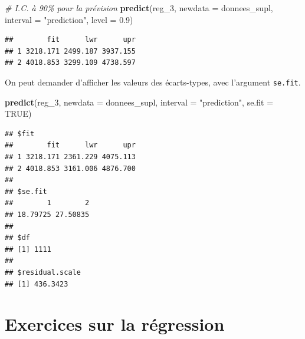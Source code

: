 \documentclass[
  11pt,
]{book}
\newenvironment{Shaded}{\begin{snugshade}}{\end{snugshade}}
\newcommand{\CommentTok}[1]{\textcolor[rgb]{0.56,0.35,0.01}{\textit{#1}}}
\newcommand{\DataTypeTok}[1]{\textcolor[rgb]{0.13,0.29,0.53}{#1}}
\newcommand{\DecValTok}[1]{\textcolor[rgb]{0.00,0.00,0.81}{#1}}
\newcommand{\FloatTok}[1]{\textcolor[rgb]{0.00,0.00,0.81}{#1}}
\newcommand{\KeywordTok}[1]{\textcolor[rgb]{0.13,0.29,0.53}{\textbf{#1}}}
\newcommand{\NormalTok}[1]{#1}
\newcommand{\OtherTok}[1]{\textcolor[rgb]{0.56,0.35,0.01}{#1}}
\newcommand{\StringTok}[1]{\textcolor[rgb]{0.31,0.60,0.02}{#1}}
\numberwithin{equation}{section}
\numberwithin{countremarque}{section}
\newcounter{exercices}[section]
\begin{document}
\begin{Shaded}
\begin{Highlighting}[]
\CommentTok{\# I.C. à 90\% pour la prévision}
\KeywordTok{predict}\NormalTok{(reg\_}\DecValTok{3}\NormalTok{, }\DataTypeTok{newdata =}\NormalTok{ donnees\_supl, }\DataTypeTok{interval =} \StringTok{"prediction"}\NormalTok{, }\DataTypeTok{level =} \FloatTok{0.9}\NormalTok{)}
\end{Highlighting}
\end{Shaded}

\begin{lstlisting}
##        fit      lwr      upr
## 1 3218.171 2499.187 3937.155
## 2 4018.853 3299.109 4738.597
\end{lstlisting}

On peut demander d'afficher les valeurs des écarts-types, avec l'argument \texttt{se.fit}.

\begin{Shaded}
\begin{Highlighting}[]
\KeywordTok{predict}\NormalTok{(reg\_}\DecValTok{3}\NormalTok{, }\DataTypeTok{newdata =}\NormalTok{ donnees\_supl, }\DataTypeTok{interval =} \StringTok{"prediction"}\NormalTok{, }\DataTypeTok{se.fit =} \OtherTok{TRUE}\NormalTok{)}
\end{Highlighting}
\end{Shaded}

\begin{lstlisting}
## $fit
##        fit      lwr      upr
## 1 3218.171 2361.229 4075.113
## 2 4018.853 3161.006 4876.700
## 
## $se.fit
##        1        2 
## 18.79725 27.50835 
## 
## $df
## [1] 1111
## 
## $residual.scale
## [1] 436.3423
\end{lstlisting}

\hypertarget{exercices-sur-la-ruxe9gression}{%
\section{Exercices sur la régression}\label{exercices-sur-la-ruxe9gression}}
\end{document}
